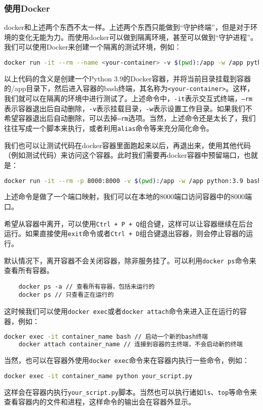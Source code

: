 \subsubsection{使用Docker}

docker和上述两个东西不太一样。上述两个东西只能做到“守护终端”，但是对于环境的变化无能为力。而使用docker可以做到隔离环境，甚至可以做到“守护进程”。我们可以使用Docker来创建一个隔离的测试环境，例如：
\begin{lstlisting}[language=bash]
    docker run -it --rm --name <your-container> -v $(pwd):/app -w /app python:3.9 bash
\end{lstlisting}
以上代码的含义是创建一个Python 3.9的Docker容器，并将当前目录挂载到容器的/app目录下，然后进入容器的bash终端，其名称为\texttt{<your-container>}。这样，我们就可以在隔离的环境中进行测试了。上述命令中，\texttt{-it}表示交互式终端，\texttt{--rm}表示容器退出后自动删除，\texttt{-v}表示挂载目录，\texttt{-w}表示设置工作目录。如果我们不希望容器退出后自动删除，可以去掉\texttt{--rm}选项。当然，上述命令还是太长了，我们往往写成一个脚本来执行，或者利用\texttt{alias}命令等来充分简化命令。

我们也可以让测试代码在docker容器里面跑起来以后，再退出来，使用其他代码（例如测试代码）来访问这个容器。此时我们需要再docker容器中预留端口，也就是：
\begin{lstlisting}[language=bash]
    docker run -it --rm -p 8000:8000 -v $(pwd):/app -w /app python:3.9 bash
\end{lstlisting}
上述命令是做了一个端口映射，我们可以在本地的8000端口访问容器中的8000端口。

希望从容器中离开，可以使用\texttt{Ctrl + P + Q}组合键，这样可以让容器继续在后台运行。如果直接使用\texttt{exit}命令或者\texttt{Ctrl + D}组合键退出容器，则会停止容器的运行。

默认情况下，离开容器不会关闭容器，除非服务挂了。可以利用\texttt{docker ps}命令来查看所有容器。
\begin{lstlisting}
    docker ps -a // 查看所有容器，包括未运行的
    docker ps // 只查看正在运行的
\end{lstlisting}

这时候我们可以使用\texttt{docker exec}或者\texttt{docker attach}命令来进入正在运行的容器，例如：
\begin{lstlisting}[language=bash]
    docker exec -it container_name bash // 启动一个新的bash终端
    docker attach container_name // 连接到容器的主终端，不会启动新的终端
\end{lstlisting}

当然，也可以在容器外使用\texttt{docker exec}命令来在容器内执行一些命令，例如：
\begin{lstlisting}[language=bash]
    docker exec -it container_name python your_script.py
\end{lstlisting}
这样会在容器内执行\texttt{your\_script.py}脚本。当然也可以执行诸如\texttt{ls}、\texttt{top}等命令来查看容器内的文件和进程，这样命令的输出会在容器外显示。

